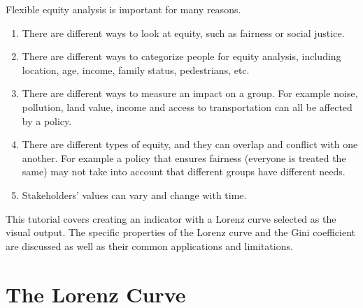 \documentclass{howto}
\begin{document}
Flexible equity analysis is important for many reasons.  
\begin{enumerate}
\item There are different ways to look at equity, such as fairness or social justice.
\item There are different ways to categorize people for equity analysis, including location, age, income, family status, pedestrians, etc.
\item There are different ways to measure an impact on a group.  For example  noise, pollution, land value, income and access to transportation can all be affected by a policy.  
\item There are different types of equity, and they can overlap and conflict with one another.  For example a policy that ensures fairness (everyone is treated the same) may not take into account that different groups have different needs. 
\item Stakeholders' values can vary and change with time. 
\end{enumerate}

This tutorial covers creating an indicator with a Lorenz curve selected as the visual output.  The specific properties of the Lorenz curve and the Gini coefficient are discussed as well as their common applications and limitations. 

\section{The Lorenz Curve}
\end{document}
